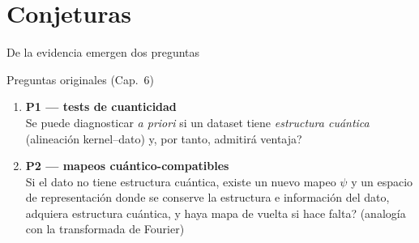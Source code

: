 \documentclass[aspectratio=169,10pt,professionalfonts]{beamer}
\begin{document}
\section{Conjeturas}
\begin{frame}{De la evidencia emergen dos preguntas}
\begin{block}{Preguntas originales (Cap.~6)}
\begin{enumerate}
  \item \textbf{P1 --- tests de cuanticidad}\\[0.35em]
        \textquestiondown{}Se puede diagnosticar \emph{a priori} si un dataset tiene
        \emph{estructura cuántica} (alineación kernel--dato) y, por tanto, admitirá ventaja?

  \vspace{1.0em}
  \item \textbf{P2 --- mapeos cuántico-compatibles}\\[0.35em]
        Si el dato no tiene estructura cuántica, \textquestiondown{}existe un nuevo mapeo $\psi$ y un espacio
        de representación donde se conserve la estructura e información del dato,
        adquiera estructura cuántica, y haya mapa de vuelta si hace falta?
        (analogía con la transformada de Fourier)
\end{enumerate}
\end{block}
\end{frame}
\end{document}
